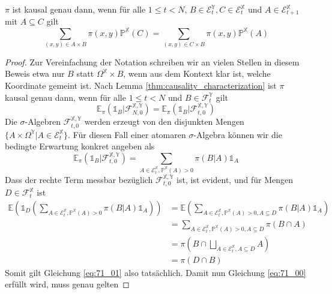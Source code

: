 \begin{lemma}\label{thm:causality_finite_case}
    $\pi$ ist kausal genau dann, wenn für alle $1\leq t < N$, $B \in \mathcal{E}_t^\mathbb{Y}, C \in \mathcal{E}_t^\mathbb{X}$ und $A \in \mathcal{E}_{t+1}^\mathbb{X}$ mit $A \subseteq C$ gilt
    $$\sum_{(x,y) \in A\times B} \pi(x,y)\mathbb{P}^\mathbb{X}(C) = \sum_{(x,y) \in C\times B} \pi(x,y) \mathbb{P}^\mathbb{X}(A)$$
\end{lemma}
\begin{proof}
Zur Vereinfachung der Notation schreiben wir an vielen Stellen in diesem Beweis etwa nur $B$ statt $\Omega^\mathbb{X} \times B$, wenn aus dem Kontext klar ist, welche Koordinate gemeint ist. Nach Lemma \ref{thm:causality_characterization} ist $\pi$ kausal genau dann, wenn für alle $1\leq t < N$ und $B \in \mathcal{F}_t^\mathbb{Y}$ gilt 
\begin{equation}\label{eq:71_00}
    \mathbb{E}_\pi(\mathds{1}_B \vert \mathcal{F}_{N,0}^{\mathbb{X,Y}}) = \mathbb{E}_\pi(\mathds{1}_B \vert \mathcal{F}_{t,0}^{\mathbb{X,Y}})
\end{equation}
Die $\sigma$-Algebren $\mathcal{F}_{t,0}^{\mathbb{X,Y}}$ werden erzeugt von den disjunkten Mengen $\{A\times \Omega^\mathbb{Y} \vert A \in \mathcal{E}_t^\mathbb{X}\}$. Für diesen Fall einer atomaren $\sigma$-Algebra können wir die bedingte Erwartung konkret angeben als
\begin{equation}\label{eq:71_01}
    \mathbb{E}_\pi(\mathds{1}_B \vert \mathcal{F}_{t,0}^{\mathbb{X,Y}}) = \sum_{A \in \mathcal{E}_t^\mathbb{X}, \mathbb{P}^\mathbb{X}(A)>0} \pi(B \vert A) \mathds{1}_{A}
\end{equation}
Dass der rechte Term messbar bezüglich $\mathcal{F}_{t,0}^{\mathbb{X,Y}}$ ist, ist evident, und für Mengen $D \in \mathcal{F}_t^\mathbb{X}$ ist 
\begin{align*}
    \mathbb{E}\left( \mathds{1}_D\left( \sum_{A \in \mathcal{E}_t^\mathbb{X}, \mathbb{P}^\mathbb{X}(A)>0} \pi(B \vert A) \mathds{1}_{A}\right)\right) &= \mathbb{E}\left( \sum_{A \in \mathcal{E}_t^\mathbb{X}, \mathbb{P}^\mathbb{X}(A)>0, A\subseteq D} \pi(B \vert A) \mathds{1}_{A}\right) \\
    &= \sum_{A \in \mathcal{E}_t^\mathbb{X}, \mathbb{P}^\mathbb{X}(A)>0, A\subseteq D} \pi(B\cap A) \\
    &= \pi\left( B\cap \bigsqcup_{A \in \mathcal{E}_t^\mathbb{X}, A\subseteq D}A\right) \\
    &= \pi(D \cap B)
\end{align*}
Somit gilt Gleichung \ref{eq:71_01} also tatsächlich. Damit nun Gleichung \ref{eq:71_00} erfüllt wird, muss genau gelten

\end{proof}

